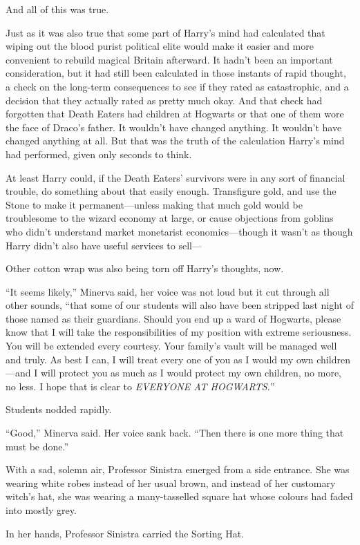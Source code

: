 And all of this was true.

Just as it was also true that some part of Harry’s mind had calculated that
wiping out the blood purist political elite would make it easier and more
convenient to rebuild magical Britain afterward. It hadn’t been an important
consideration, but it had still been calculated in those instants of rapid
thought, a check on the long-term consequences to see if they rated as
catastrophic, and a decision that they actually rated as pretty much okay. And
that check had forgotten that Death Eaters had children at Hogwarts or that one
of them wore the face of Draco’s father. It wouldn’t have changed anything. It
wouldn’t have changed anything at all. But that was the truth of the
calculation Harry’s mind had performed, given only seconds to think.

At least Harry could, if the Death Eaters’ survivors were in any sort of
financial trouble, do something about that easily enough. Transfigure gold, and
use the Stone to make it permanent—unless making that much gold would be
troublesome to the wizard economy at large, or cause objections from goblins
who didn’t understand market monetarist economics—though it wasn’t as though
Harry didn’t also have useful services to sell—

Other cotton wrap was also being torn off Harry’s thoughts, now.

“It seems likely,” Minerva said, her voice was not loud but it cut through all
other sounds, “that some of our students will also have been stripped last
night of those named as their guardians. Should you end up a ward of Hogwarts,
please know that I will take the responsibilities of my position with extreme
seriousness. You will be extended every courtesy. Your family’s vault will be
managed well and truly. As best I can, I will treat every one of you as I would
my own children—and I will protect you as much as I would protect my own
children, no more, no less. I hope that is clear to \emph{EVERYONE AT
HOGWARTS.}”

Students nodded rapidly.

“Good,” Minerva said. Her voice sank back. “Then there is one more thing that
must be done.”

With a sad, solemn air, Professor Sinistra emerged from a side entrance. She
was wearing white robes instead of her usual brown, and instead of her
customary witch’s hat, she was wearing a many-tasselled square hat whose colours
had faded into mostly grey.

In her hands, Professor Sinistra carried the Sorting Hat.

